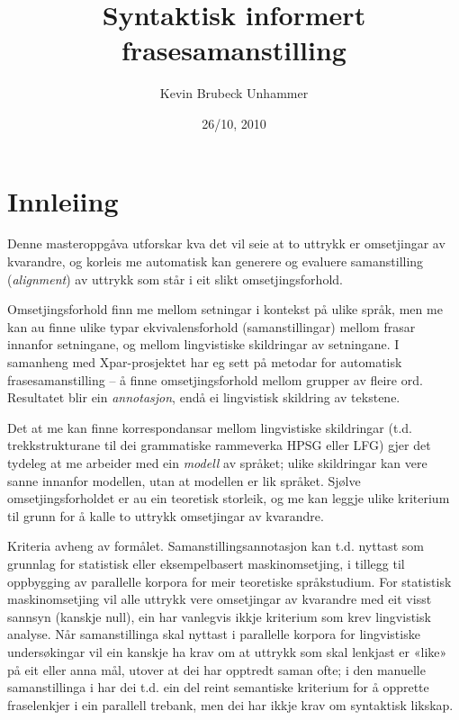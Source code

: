 \documentclass[11pt,a4paper,oneside,draft]{book}
\title{Syntaktisk informert frasesamanstilling }
\author{Kevin Brubeck Unhammer}
\date{26/10, 2010}
\begin{document}
\maketitle

\setcounter{tocdepth}{4}
\tableofcontents
\vspace*{1cm}


\chapter{Innleiing}
\label{sec-1}

\label{SEC:innleiing}


Denne masteroppgåva utforskar kva det vil seie at to uttrykk er
omsetjingar av kvarandre, og korleis me automatisk kan generere og
evaluere samanstilling (\emph{alignment}) av uttrykk som
står i eit slikt omsetjingsforhold. 

Omsetjingsforhold finn me mellom setningar i kontekst på ulike språk,
men me kan au finne ulike typar ekvivalensforhold (samanstillingar)
mellom frasar innanfor setningane, og mellom lingvistiske
skildringar av setningane. I samanheng med Xpar-prosjektet
\citep{xpar2008rcn} har eg sett på metodar for automatisk
frasesamanstilling – å finne omsetjingsforhold mellom grupper av
fleire ord. Resultatet blir ein \emph{annotasjon}, endå ei lingvistisk
skildring av tekstene.



Det at me kan finne korrespondansar mellom lingvistiske skildringar
(t.d. trekkstrukturane til dei grammatiske rammeverka HPSG eller LFG)
gjer det tydeleg at me arbeider med ein \emph{modell} av språket; ulike
skildringar kan vere sanne innanfor modellen, utan at modellen er lik
språket. Sjølve omsetjingsforholdet er au ein teoretisk storleik, og
me kan leggje ulike kriterium til grunn for å kalle to uttrykk
omsetjingar av kvarandre.

Kriteria avheng av formålet. Samanstillingsannotasjon kan t.d. nyttast
som grunnlag for statistisk eller eksempelbasert maskinomsetjing, i
tillegg til oppbygging av parallelle korpora for meir teoretiske
språkstudium.  For statistisk maskinomsetjing vil alle uttrykk vere
omsetjingar av kvarandre med eit visst sannsyn (kanskje null), ein
har vanlegvis ikkje kriterium som krev lingvistisk analyse. Når
samanstillinga skal nyttast i parallelle korpora for lingvistiske
undersøkingar vil ein kanskje ha krav om at uttrykk som skal lenkjast
er «like» på eit eller anna mål, utover at dei har opptredt saman
ofte; i den manuelle samanstillinga i \citet{samuelsson2006pap} har
dei t.d. ein del reint semantiske kriterium for å opprette
fraselenkjer i ein parallell trebank, men dei har ikkje krav om
syntaktisk likskap.
\end{document}
